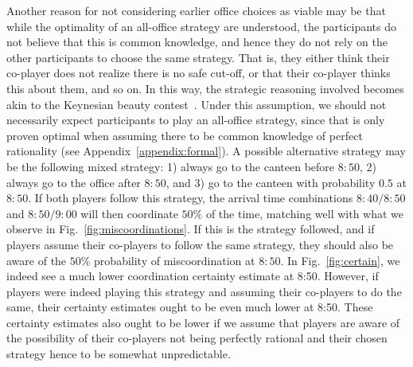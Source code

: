 Another reason for not considering earlier office choices as viable may be that while the optimality of an all-office strategy are understood, the participants do not believe that this is common knowledge, and hence they do not rely on the other participants to choose the same strategy. That is, they either think their co-player does not realize there is no safe cut-off, or that their co-player thinks this about them, and so on. In this way, the strategic reasoning involved becomes akin to the Keynesian beauty contest~\cite{keynes1936general,nagel1995unraveling}. Under this assumption, we should not necessarily expect participants to play an all-office strategy, since that is only proven optimal when assuming there to be common knowledge of perfect rationality (see Appendix~\ref{appendix:formal}). A possible alternative strategy may be the following mixed strategy: 1) always go to the canteen before $8{:}50$, 2) always go to the office after $8{:}50$, and 3) go to the canteen with probability $0.5$ at $8{:}50$. If both players follow this strategy, the arrival time combinations $8{:}40/8{:}50$ and $8{:}50/9{:}00$ will then coordinate $50\%$ of the time, matching well with what we observe in Fig.~\ref{fig:miscoordinations}. If this is the strategy followed, and if players assume their co-players to follow the same strategy, they should also be aware of the $50\%$ probability of miscoordination at $8{:}50$. In Fig.~\ref{fig:certain}, we indeed see a much lower coordination certainty estimate at 8:50. However, if players were indeed playing this strategy and assuming their co-players to do the same, their certainty estimates ought to be even much lower at 8{:}50. %
 These certainty estimates also ought to be lower if we assume that players are aware of the possibility of their co-players not being perfectly rational and their chosen strategy hence to be somewhat unpredictable. 


